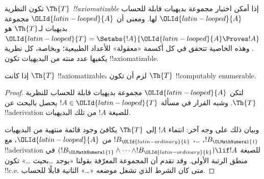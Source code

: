 \documentclass[../../../include/open-logic-section]{subfiles}
\begin{document}


تكون النظرية $\Th{T}$ \emph{!!{axiomatizable}} إذا أمكن اختيار
مجموعة بديهيات قابلة للحساب $\OLId{latin-looped}{A}$ لها. ومعنى أن $\OLId{latin-looped}{A}$ مجموعة بديهيات
لـ$\Th{T}$ هو $\OLId{latin-looped}{T}=\Setabs{!A}{\OLId{latin-looped}{A}\Proves !A}$. وهذه الخاصية تتحقق في
كل أكسمة «معقولة» للأعداد الطبيعية؛ وبخاصة، كل نظرية يكفيها عدد
منته من البديهيات تكون !!{axiomatizable}.

\begin{lem}
إذا كانت $\Th{T}$ !!{axiomatizable}، لزم أن تكون $\Th{T}$
!!{computably
enumerable}.
\end{lem}

\begin{proof}
لتكن $\OLId{latin-looped}{A}$ مجموعة بديهيات قابلة للحساب للنظرية $\Th{T}$. وشبه القرار
في مسألة $!A\in \OLId{latin-looped}{T}$ يحصل بالبحث عن !!a{derivation} للصيغة $!A$
من تلك البديهيات.

وبيان ذلك على وجه آخر: انتماء $!A$ إلى $\Th{T}$ يكافئ وجود قائمة
منتهية من البديهيات $!B_\OLMathNumeral{1}$، \dots، $!B_\OLId{latin-ordinary}{k}$ من $\OLId{latin-looped}{A}$، مع
!!a{derivation} للصيغة
$(!B_\OLMathNumeral{1}\land\dots\land !B_\OLId{latin-ordinary}{k})\lif !A$ في منطق الرتبة الأولى.
وقد تقدم أن المجموعة المعرّفة بقولنا «يوجد \dots بحيث \dots»
تكون !!{c.e.} متى كان الشرط الذي تشغل موضعه «\dots» الثانية قابلًا
للحساب.
\end{proof}
\end{document}
